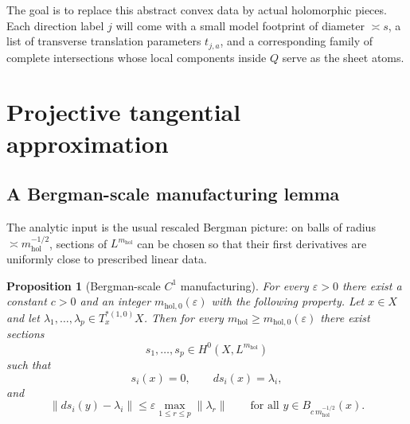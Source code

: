 \documentclass[11pt]{article}
\numberwithin{equation}{section}
\theoremstyle{plain}
\newtheorem{proposition}[theorem]{Proposition}
\theoremstyle{definition}
\theoremstyle{remark}
\newcommand{\eps}{\varepsilon}
\newcommand{\mhol}{m_{\mathrm{hol}}}
\begin{document}
The goal is to replace this abstract convex data by actual holomorphic pieces.  Each direction label $j$ will come with a small model footprint of diameter $\asymp s$, a list of transverse translation parameters $t_{j,a}$, and a corresponding family of complete intersections whose local components inside $Q$ serve as the sheet atoms.

\section{Projective tangential approximation}

\subsection{A Bergman-scale manufacturing lemma}

The analytic input is the usual rescaled Bergman picture: on balls of radius $\asymp \mhol^{-1/2}$, sections of $L^{\mhol}$ can be chosen so that their first derivatives are uniformly close to prescribed linear data.

\begin{proposition}[Bergman-scale $C^1$ manufacturing]\label{prop:bergman}
For every $\eps>0$ there exist a constant $c>0$ and an integer $m_{\mathrm{hol},0}(\eps)$ with the following property.  Let $x \in X$ and let $\lambda_1,\dots,\lambda_p \in T_x^{*(1,0)}X$.  Then for every $\mhol \ge m_{\mathrm{hol},0}(\eps)$ there exist sections
\[
s_1,\dots,s_p \in H^0(X,L^{\mhol})
\]
such that
\[
s_i(x)=0,
\qquad
ds_i(x)=\lambda_i,
\]
and
\[
\|ds_i(y)-\lambda_i\|
\le
\eps \max_{1\le r \le p}\|\lambda_r\|
\qquad
\text{for all } y \in B_{c\,\mhol^{-1/2}}(x).
\]
\end{proposition}
\end{document}
